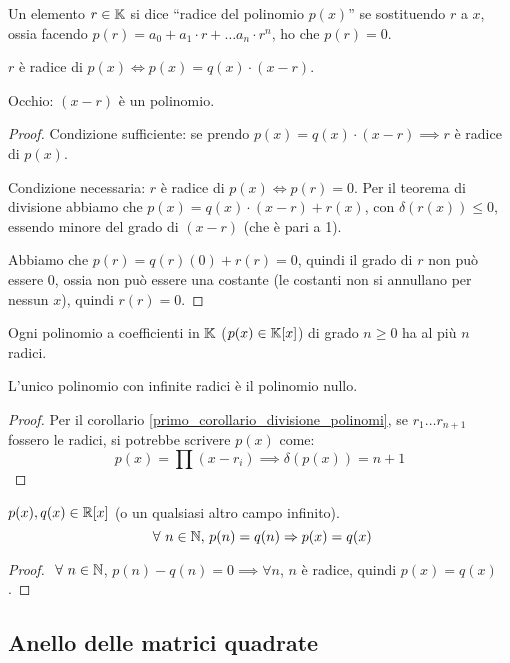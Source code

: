 Un elemento $r \in \mathbb{K}$ si dice ``radice del polinomio $p(x)$'' se sostituendo $r$ a $x$, ossia facendo $p(r) = a_0 + a_1 \cdot r + \dots a_n \cdot r^n$, ho che $p(r) = 0$.

\begin{cor}
$r$ \`e radice di $p(x) \iff p(x) = q(x) \cdot (x - r)$.

Occhio: $(x - r)$ \`e un polinomio.
\end{cor}
\begin{proof}
Condizione sufficiente: se prendo $p(x) = q(x) \cdot (x - r) \implies r$ \`e radice di $p(x)$.

Condizione necessaria: $r$ \`e radice di $p(x) \iff p(r) = 0$. Per il teorema di divisione abbiamo che $p(x) = q(x) \cdot (x - r) + r(x)$, con $\delta(r(x)) \le 0$, essendo minore del grado di $(x - r)$ (che \`e pari a 1).

Abbiamo che $p(r) = q(r) (0) + r(r) = 0$, quindi il grado di $r$ non pu\`o essere 0, ossia non pu\`o essere una costante (le costanti non si annullano per nessun $x$), quindi $r(r) = 0$.
\end{proof}
\begin{cor}
Ogni polinomio a coefficienti in $\mathbb{K}$ ($p(x) \in \mathbb{K}[x]$) di grado $n \ge 0$ ha al pi\`u $n$ radici.

L'unico polinomio con infinite radici \`e il polinomio nullo.
\end{cor}
\begin{proof}
Per il corollario \ref{primo_corollario_divisione_polinomi}, se $r_1 \dots r_{n+1}$ fossero le radici, si potrebbe scrivere $p(x)$ come:
\[
p(x) = \prod (x - r_i) \implies \delta(p(x)) = n + 1
\]
\end{proof}

\begin{theorem}
$p(x), q(x) \in \mathbb{R}[x]$ (o un qualsiasi altro campo infinito).
\[
\forall n \in \naturals , \, p(n) = q(n) \implies p(x) = q(x)
\]
\end{theorem}
\begin{proof}
$\forall n \in \naturals$, $ p(n) - q(n) = 0 \implies \forall n$, $n$ \`e radice, quindi $p(x) = q(x)$.
\end{proof}

\subsection{Anello delle matrici quadrate}

